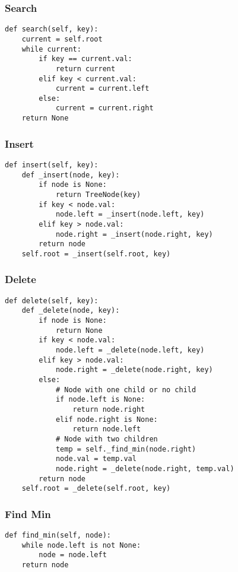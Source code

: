 \subsubsection{Search}
\begin{algo}
\begin{lstlisting}
def search(self, key):
    current = self.root
    while current:
        if key == current.val:
            return current
        elif key < current.val:
            current = current.left
        else:
            current = current.right
    return None
\end{lstlisting}
\end{algo}

\subsubsection{Insert}
\begin{algo}
\begin{lstlisting}
def insert(self, key):
    def _insert(node, key):
        if node is None:
            return TreeNode(key)
        if key < node.val:
            node.left = _insert(node.left, key)
        elif key > node.val:
            node.right = _insert(node.right, key)
        return node
    self.root = _insert(self.root, key)
\end{lstlisting}
\end{algo}

\subsubsection{Delete}
\begin{algo}
\begin{lstlisting}
def delete(self, key):
    def _delete(node, key):
        if node is None:
            return None
        if key < node.val:
            node.left = _delete(node.left, key)
        elif key > node.val:
            node.right = _delete(node.right, key)
        else:
            # Node with one child or no child
            if node.left is None:
                return node.right
            elif node.right is None:
                return node.left
            # Node with two children
            temp = self._find_min(node.right)
            node.val = temp.val
            node.right = _delete(node.right, temp.val)
        return node
    self.root = _delete(self.root, key)
\end{lstlisting}
\end{algo}
    
\subsubsection{Find Min}
\begin{algo}
\begin{lstlisting}
def find_min(self, node):
    while node.left is not None:
        node = node.left
    return node
\end{lstlisting}
\end{algo}

